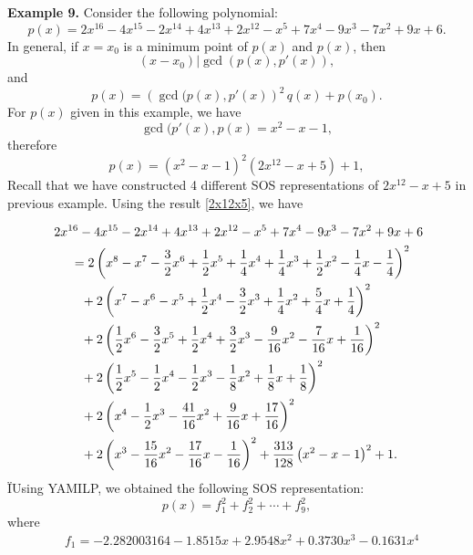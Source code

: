 \documentclass[runningheads]{llncs}
\begin{document}
{{\bf Example 9. } 
Consider the following polynomial:
$$
p(x)=2{x}^{16}-4{x}^{15}-2{x}^{14}+4{x}^{13}+2{x}^{12}-{x}^{5}+7
{x}^{4}-9{x}^{3}-7{x}^{2}+9x+6.
$$
In general, if $x=x_0$ is a minimum point of $p(x)$ and $p(x)$, then
$$
(x-x_0)|\gcd(p(x),p'(x)),
$$
and 
$$
p(x)=\left(\gcd(p(x),p'(x)\right)^2\, q(x)+p(x_0).
$$
For $p(x)$ given in this example, we have
$$
\gcd(p'(x),p(x)=x^2-x-1,
$$
therefore
$$
p(x)=(x^2 - x -1)^2( 2x^{12} - x + 5)+1,
$$
Recall that we have constructed 4 different SOS representations of $2x^{12} - x + 5$ in previous example. Using the result \eqref{2x12x5}, we have

\begin{align}\label{eq-poly-yang-05}
&
~~~~
2{x}^{16}-4{x}^{15}-2{x}^{14}+4{x}^{13}+2{x}^{12}-{x}^{5}+7
{x}^{4}-9{x}^{3}-7{x}^{2}+9x+6\notag\\
&~~~~~~~~=2 \left( {x}^{8}-{x}^{7}-\frac{3}{2}
{x}^{6}+\frac{1}{2}{x}^{5}+\frac{1}{4}{x}^{4}+\frac{1}{4}{x}^{3}+\frac{1}{2}{x}^{2}-\frac{1}{4} x-\frac{1}{4}
 \right) ^{2}\notag\\
&~~~~~~~~\phantom{=}+2 \left( {x}^{7}-{x}^{6}-{x}^{5}+\frac{1}{2}{x}^{4}-\frac{3}{2}{x}
^{3}+\frac{1}{4}{x}^{2}+\frac{5}{4}x+\frac{1}{4} \right) ^{2}\notag\\
&~~~~~~~~\phantom{=}+2 \left( \frac{1}{2}{x}^{6}-\frac{3}{2}
{x}^{5}+\frac{1}{2}{x}^{4}+\frac{3}{2}{x}^{3}-{\frac {9}{16}{x}^{2}}-{\frac {7
}{16}x}+\frac{1}{16} \right) ^{2}\notag\\
&~~~~~~~~\phantom{=}+2 \left( \frac{1}{2}{x}^{5}-\frac{1}{2}{x}^{4}-\frac{1}{2}
{x}^{3}-\frac{1}{8}{x}^{2}+\frac{1}{8} x+\frac{1}{8} \right) ^{2}\notag\\
&~~~~~~~~\phantom{=}+2 \left( {x}^{4}-\frac{1}{2}{x}^
{3}-{\frac {41}{16}{x}^{2}}+{\frac {9}{16}x}+{\frac{17}{16}}
 \right) ^{2}
 \notag\\&~~~~~~~~\phantom{=}
 +2 \left( {x}^{3}-{\frac {15}{16}{x}^{2}}-{\frac {17
}{16}x}-\frac{1}{16} \right) ^{2}
+{\frac {313 }{128}\left( {x}^{2}-x-1 \right) ^
{2}}
+1. %
&
\end{align}
ÏUsing YAMILP, we obtained the following SOS representation: 
$$
p(x)=f_1^2+f_2^2+\cdots+f_9^2,
$$
where
\begin{align*}
&f_1 = - 2.282003164 - 1.8515  x+ 2.9548  x^2 + 0.3730  x^3- 0.1631  x^4\\

\end{align*}}
\end{document}
